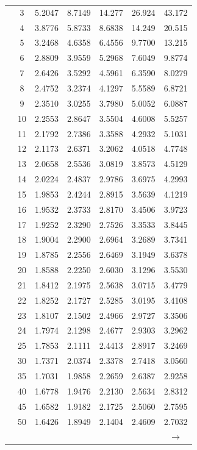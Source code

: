 \begin{minipage}{0.49\textwidth}
\begin{center}
\begin{tabular}{ccccccc}
			& 3 & 5.2047 & 8.7149 & 14.277 & 26.924 & 43.172 \\
			& 4 & 3.8776 & 5.8733 & 8.6838 & 14.249 & 20.515 \\
			& 5 & 3.2468 & 4.6358 & 6.4556 & 9.7700 & 13.215 \\
			& 6 & 2.8809 & 3.9559 & 5.2968 & 7.6049 & 9.8774 \\
			& 7 & 2.6426 & 3.5292 & 4.5961 & 6.3590 & 8.0279 \\
			& 8 & 2.4752 & 3.2374 & 4.1297 & 5.5589 & 6.8721 \\
			& 9 & 2.3510 & 3.0255 & 3.7980 & 5.0052 & 6.0887 \\[5pt]
			& 10 & 2.2553 & 2.8647 & 3.5504 & 4.6008 & 5.5257 \\
			& 11 & 2.1792 & 2.7386 & 3.3588 & 4.2932 & 5.1031 \\
			& 12 & 2.1173 & 2.6371 & 3.2062 & 4.0518 & 4.7748 \\
			& 13 & 2.0658 & 2.5536 & 3.0819 & 3.8573 & 4.5129 \\
			& 14 & 2.0224 & 2.4837 & 2.9786 & 3.6975 & 4.2993 \\
			& 15 & 1.9853 & 2.4244 & 2.8915 & 3.5639 & 4.1219 \\
			& 16 & 1.9532 & 2.3733 & 2.8170 & 3.4506 & 3.9723 \\
			& 17 & 1.9252 & 2.3290 & 2.7526 & 3.3533 & 3.8445 \\
			& 18 & 1.9004 & 2.2900 & 2.6964 & 3.2689 & 3.7341 \\
			& 19 & 1.8785 & 2.2556 & 2.6469 & 3.1949 & 3.6378 \\[5pt]
			& 20 & 1.8588 & 2.2250 & 2.6030 & 3.1296 & 3.5530 \\
			& 21 & 1.8412 & 2.1975 & 2.5638 & 3.0715 & 3.4779 \\
			& 22 & 1.8252 & 2.1727 & 2.5285 & 3.0195 & 3.4108 \\
			& 23 & 1.8107 & 2.1502 & 2.4966 & 2.9727 & 3.3506 \\
			& 24 & 1.7974 & 2.1298 & 2.4677 & 2.9303 & 3.2962 \\
			& 25 & 1.7853 & 2.1111 & 2.4413 & 2.8917 & 3.2469 \\
			& 30 & 1.7371 & 2.0374 & 2.3378 & 2.7418 & 3.0560 \\
			& 35 & 1.7031 & 1.9858 & 2.2659 & 2.6387 & 2.9258 \\
			& 40 & 1.6778 & 1.9476 & 2.2130 & 2.5634 & 2.8312 \\
			& 45 & 1.6582 & 1.9182 & 2.1725 & 2.5060 & 2.7595 \\
			& 50 & 1.6426 & 1.8949 & 2.1404 & 2.4609 & 2.7032 \\
			&  &  &  &  &  & $\rightarrow$ \\
		\end{tabular}
	\end{center}
\end{minipage}
